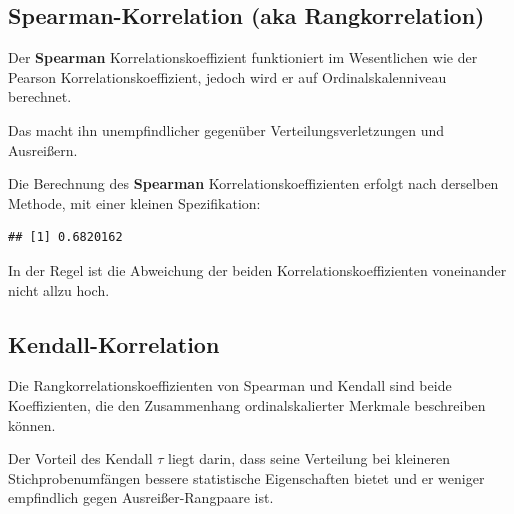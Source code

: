 \documentclass[
]{book}
\newenvironment{Shaded}{\begin{snugshade}}{\end{snugshade}}
\newcommand{\AttributeTok}[1]{\textcolor[rgb]{0.13,0.29,0.53}{#1}}
\newcommand{\FunctionTok}[1]{\textcolor[rgb]{0.13,0.29,0.53}{\textbf{#1}}}
\newcommand{\NormalTok}[1]{#1}
\newcommand{\SpecialCharTok}[1]{\textcolor[rgb]{0.81,0.36,0.00}{\textbf{#1}}}
\newcommand{\StringTok}[1]{\textcolor[rgb]{0.31,0.60,0.02}{#1}}
\begin{document}
\subsection{Spearman-Korrelation (aka Rangkorrelation)}\label{spearman-korrelation-aka-rangkorrelation}

Der \textbf{Spearman} Korrelationskoeffizient funktioniert im Wesentlichen wie der Pearson Korrelationskoeffizient, jedoch wird er auf Ordinalskalenniveau berechnet.

Das macht ihn unempfindlicher gegenüber Verteilungsverletzungen und Ausreißern.

Die Berechnung des \textbf{Spearman} Korrelationskoeffizienten erfolgt nach derselben Methode, mit einer kleinen Spezifikation:

\begin{Shaded}
\end{Shaded}

\begin{verbatim}
## [1] 0.6820162
\end{verbatim}

In der Regel ist die Abweichung der beiden Korrelationskoeffizienten voneinander nicht allzu hoch.

\subsection{Kendall-Korrelation}\label{kendall-korrelation}

Die Rangkorrelationskoeffizienten von Spearman und Kendall sind beide Koeffizienten, die den Zusammenhang ordinalskalierter Merkmale beschreiben können.

Der Vorteil des Kendall \(τ\) liegt darin, dass seine Verteilung bei kleineren Stichprobenumfängen bessere statistische Eigenschaften bietet und er weniger empfindlich gegen Ausreißer-Rangpaare ist.

\begin{Shaded}
\end{Shaded}
\end{document}
